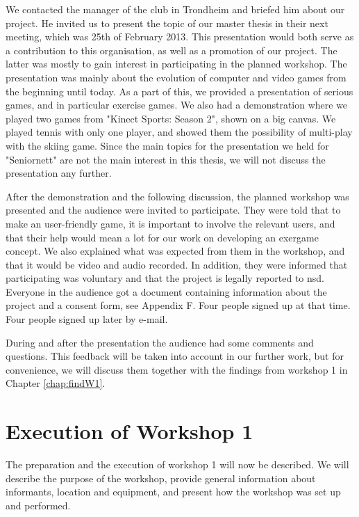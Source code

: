 We contacted the manager of the club in Trondheim and briefed him about our project. He invited us to present the topic of our master thesis in their next meeting, which was 25th of February 2013. This presentation would both serve as a contribution to this organisation, as well as a promotion of our project. The latter was mostly to gain interest in participating in the planned workshop. The presentation was mainly about the evolution of computer and video games from the beginning until today. As a part of this, we provided a presentation of serious games, and in particular exercise games. We also had a demonstration where we played two games from "Kinect Sports: Season 2", shown on a big canvas. We played tennis with only one player, and showed them the possibility of multi-play with the skiing game. Since the main topics for the presentation we held for "Seniornett" are not the main interest in this thesis, we will not discuss the presentation any further.

After the demonstration and the following discussion, the planned workshop was presented and the audience were invited to participate. They were told that to make an user-friendly game, it is important to involve the relevant users, and that their help would mean a lot for our work on developing an exergame concept. We also explained what was expected from them in the workshop, and that it would be video and audio recorded. In addition, they were informed that participating was voluntary and that the project is legally reported to \ac{nsd}. Everyone in the audience got a document containing information about the project and a consent form, see Appendix F. Four people signed up at that time. Four people signed up later by e-mail.

During and after the presentation the audience had some comments and questions. This feedback will be taken into account in our further work, but for convenience, we will discuss them together with the findings from workshop 1 in Chapter \ref{chap:findW1}. 

\section{Execution of Workshop 1}
\label{sec:ws1}

The preparation and the execution of workshop 1 will now be described. We will describe the purpose of the workshop, provide general information about informants, location and equipment, and present how the workshop was set up and performed. 


